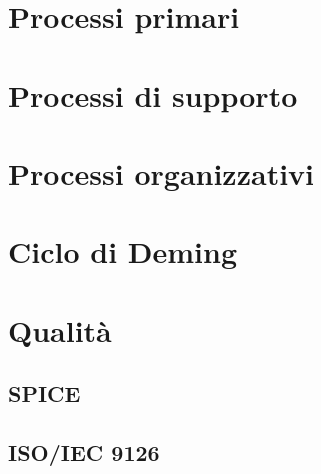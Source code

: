 \documentclass[a4paper, oneside, openany, dvipsnames, table]{article}
\begin{document}
\copertina{}
\newpage

\newpage
\tableofcontents
\newpage
\listoffigures
\newpage
\listoftables
\newpage
	
\section{Processi primari}
	
	
 
\newpage
\section{Processi di supporto}


\newpage
\section{Processi organizzativi}



\appendix
{}

\newpage
\section{Ciclo di Deming}


\newpage
\section{Qualità}
	\subsection{SPICE}
		\label{app:SPICE}
		
	\subsection{ISO/IEC 9126}
		\label{app:ISO/IEC 9126}
		
\end{document}
